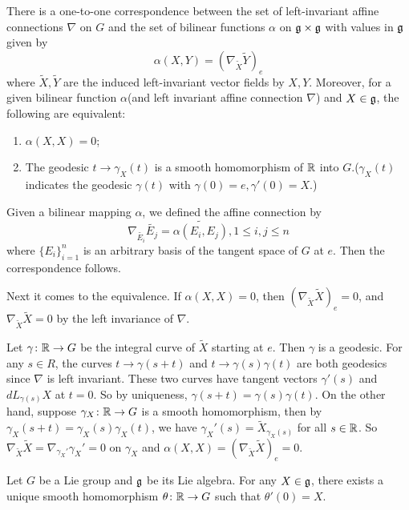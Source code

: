 \begin{lemma}\label{8}
	There is a one-to-one correspondence between the set of
	left-invariant affine connections $\nabla$ on $G$ and the set
	of bilinear functions $\alpha$ on ${\mathfrak g}\times{\mathfrak g}$ with
	values in ${\mathfrak g}$ given by
	\[ \alpha(X, Y)=(\nabla_{\tilde X}\tilde Y)_e \]
	where $\tilde X, \tilde Y$ are the induced left-invariant vector fields by
	$X, Y$. Moreover, for a given bilinear function $\alpha$(and
	left invariant affine connection $\nabla$) and $X\in {\mathfrak g}$,
	the following are equivalent:
	
  \begin{enumerate}
	  \item $\alpha(X, X)=0$;
	
	  \item The geodesic $t\to \gamma_X(t)$ is a smooth homomorphism
	of ${\mathbb R}$ into $G$.($\gamma_X(t)$ indicates the geodesic
	$\gamma(t)$ with $\gamma(0)=e, \gamma'(0)=X$.)
  \end{enumerate}
	\bproof
	Given a bilinear mapping $\alpha$, we defined the affine
	connection by
	\[
	\nabla_{\tilde{E_i}}\tilde{E_j}=\tilde{\alpha(E_i,E_j)},
	1\le i,j\le n
	\]
	where $\{E_i\}_{i=1}^n$ is an arbitrary basis of the tangent
	space of $G$ at $e$. Then the correspondence follows.
	
	Next it comes to the equivalence. If $\alpha(X,X)=0$, then
	$(\nabla_{\tilde X}\tilde{X})_e=0$, and $\nabla_{\tilde
	X}\tilde{X}=0$ by the left invariance of $\nabla$.
	
	Let $\gamma\colon{\mathbb R}\to G$ be the integral curve of $\tilde{X}$
	starting at $e$. Then $\gamma $ is a geodesic. For any $s\in
	R$, the curves $t\to \gamma(s+t)$ and $t\to
	\gamma(s)\gamma(t)$ are both geodesics since $\nabla$ is left
	invariant. These two curves have tangent vectors $\gamma'(s)$
	and $dL_{\gamma(s)}X$ at $t=0$. So by uniqueness,
	$\gamma(s+t)=\gamma(s)\gamma(t)$. On the other hand, suppose
	$\gamma_X\colon{\mathbb R}\to G$ is a smooth homomorphism, then by
	$\gamma_X(s+t)=\gamma_X(s)\gamma_X(t)$, we have
	$\gamma_X'(s)=\tilde X_{\gamma_X(s)}$ for all $s\in {\mathbb R}$. So
	$\nabla_{\tilde X}\tilde{X}=\nabla_{\gamma_X'}\gamma_X'=0$ on
	$\gamma_X$ and $\alpha(X,X)=(\nabla_{\tilde
	X}\tilde{X})_e=0$.
	\eproof
\end{lemma}
\begin{corollary}\label{9}
	Let $G$ be a Lie group and ${\mathfrak g}$ be its Lie algebra. For any
	$X\in {\mathfrak g}$, there exists a unique smooth homomorphism
	$\theta\colon{\mathbb R}\to G$ such that $\theta'(0)=X$.
\end{corollary}
